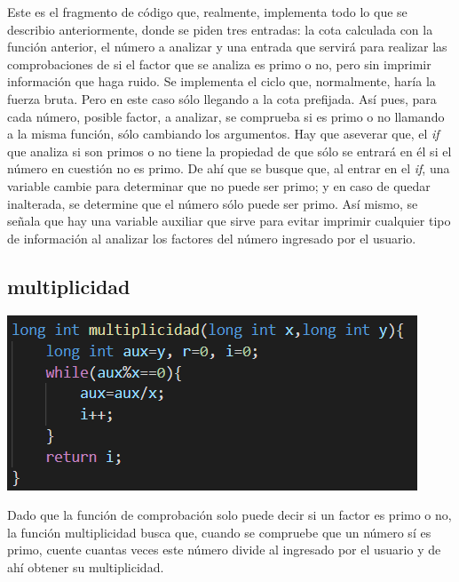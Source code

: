 \documentclass[12pt]{article}
\begin{document}
Este es el fragmento de c\'odigo que, realmente, implementa todo lo que se describio anteriormente, donde se piden tres entradas: la cota calculada con la funci\'on anterior, el n\'umero a analizar y una entrada que servir\'a para realizar las comprobaciones de si el factor que se analiza es primo o no, pero sin imprimir informaci\'on que haga ruido.
Se implementa el ciclo que, normalmente, har\'{i}a la fuerza bruta. Pero en este caso s\'olo llegando a la cota prefijada. As\'{i} pues, para cada n\'umero, posible factor, a analizar, se comprueba si es primo o no llamando a la misma funci\'on, s\'olo cambiando los argumentos. Hay que aseverar que, el \textit{if} que analiza si son primos o no tiene la propiedad de que s\'olo se entrar\'a en \'el si el n\'umero en cuesti\'on no es primo. De ah\'{i} que se busque que, al entrar en el \textit{if}, una variable cambie para determinar que no puede ser primo; y en caso de quedar inalterada, se determine que el n\'umero s\'olo puede ser primo.
As\'i mismo, se señala que hay una variable auxiliar que sirve para evitar imprimir cualquier tipo de informaci\'on al analizar los factores del n\'umero ingresado por el usuario. 

\subsection{multiplicidad}
\begin{center}
 \includegraphics[scale=1]{multiplicidad}
\end{center}

Dado que la funci\'on de comprobaci\'on solo puede decir si un factor es primo o no, la funci\'on multiplicidad busca que, cuando se compruebe que un n\'umero s\'{i} es primo, cuente cuantas veces este n\'umero divide al ingresado por el usuario y de ah\'i obtener su multiplicidad. 
\end{document}
